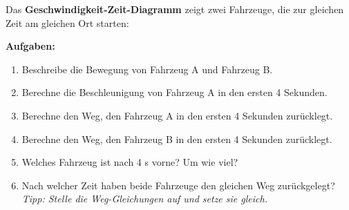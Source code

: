 \documentclass[11pt,a4paper]{article}
\begin{document}
\vspace{0.5cm}

\begin{aufgabe}
Das \textbf{Geschwindigkeit-Zeit-Diagramm} zeigt zwei Fahrzeuge, die zur gleichen Zeit am gleichen Ort starten:

\begin{center}
\end{center}

\textbf{Aufgaben:}
\begin{enumerate}[label=\alph*)]
\item Beschreibe die Bewegung von Fahrzeug A und Fahrzeug B.
\item Berechne die Beschleunigung von Fahrzeug A in den ersten 4 Sekunden.
\item Berechne den Weg, den Fahrzeug A in den ersten 4 Sekunden zurücklegt.
\item Berechne den Weg, den Fahrzeug B in den ersten 4 Sekunden zurücklegt.
\item Welches Fahrzeug ist nach 4 s vorne? Um wie viel?
\item Nach welcher Zeit haben beide Fahrzeuge den gleichen Weg zurückgelegt?\\
\textit{Tipp: Stelle die Weg-Gleichungen auf und setze sie gleich.}
\end{enumerate}
\end{aufgabe}

\vspace{0.5cm}
\end{document}
